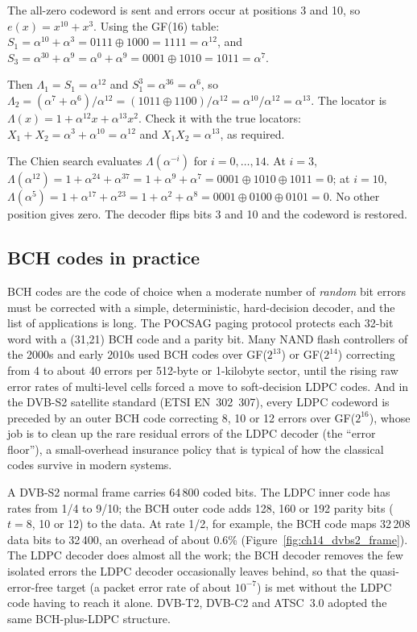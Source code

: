 \begin{worked}
The all-zero codeword is sent and errors occur at positions 3 and 10, so $e(x)=x^{10}+x^3$. Using
the GF(16) table: $S_1=\alpha^{10}+\alpha^3=0111\oplus1000=1111=\alpha^{12}$, and
$S_3=\alpha^{30}+\alpha^9=\alpha^0+\alpha^9=0001\oplus1010=1011=\alpha^7$.

Then $\Lambda_1=S_1=\alpha^{12}$ and $S_1^3=\alpha^{36}=\alpha^{6}$, so
$\Lambda_2=(\alpha^7+\alpha^6)/\alpha^{12}=(1011\oplus1100)/\alpha^{12}=\alpha^{10}/\alpha^{12}
=\alpha^{13}$. The locator is $\Lambda(x)=1+\alpha^{12}x+\alpha^{13}x^2$. Check it with the true
locators: $X_1+X_2=\alpha^3+\alpha^{10}=\alpha^{12}$ and $X_1X_2=\alpha^{13}$, as required.

The Chien search evaluates $\Lambda(\alpha^{-i})$ for $i=0,\dots,14$. At $i=3$,
$\Lambda(\alpha^{12})=1+\alpha^{24}+\alpha^{37}=1+\alpha^9+\alpha^7=0001\oplus1010\oplus1011=0$; at
$i=10$, $\Lambda(\alpha^5)=1+\alpha^{17}+\alpha^{23}=1+\alpha^2+\alpha^8=0001\oplus0100\oplus0101=0$.
No other position gives zero. The decoder flips bits 3 and 10 and the codeword is restored.
\end{worked}

\subsection{BCH codes in practice}

BCH codes are the code of choice when a moderate number of \emph{random} bit errors must be
corrected with a simple, deterministic, hard-decision decoder, and the list of applications is
long. The POCSAG paging protocol protects each 32-bit word with a (31,21) BCH code and a parity
bit. Many NAND flash controllers of the 2000s and early 2010s used BCH codes over GF($2^{13}$) or
GF($2^{14}$) correcting from 4 to about 40 errors per 512-byte or 1-kilobyte sector, until the
rising raw error rates of multi-level cells forced a move to soft-decision LDPC codes. And in the
DVB-S2 satellite standard (ETSI EN~302~307), every LDPC codeword is preceded by an outer BCH code
correcting 8, 10 or 12 errors over GF($2^{16}$), whose job is to clean up the rare residual errors
of the LDPC decoder (the ``error floor''), a small-overhead insurance policy that is typical of
how the classical codes survive in modern systems.

\begin{inpractice}
A DVB-S2 normal frame carries 64\,800 coded bits. The LDPC inner code has rates from 1/4 to 9/10;
the BCH outer code adds 128, 160 or 192 parity bits ($t=8$, 10 or 12) to the data. At rate 1/2,
for example, the BCH code maps 32\,208 data bits to 32\,400, an overhead of about 0.6\%
(Figure~\ref{fig:ch14_dvbs2_frame}). The LDPC decoder does almost all the work; the BCH decoder
removes the few isolated errors the LDPC decoder occasionally leaves behind, so that the
quasi-error-free target (a packet error rate of about $10^{-7}$) is met without the LDPC code having
to reach it alone. DVB-T2, DVB-C2 and ATSC~3.0 adopted the same BCH-plus-LDPC structure.
\end{inpractice}

